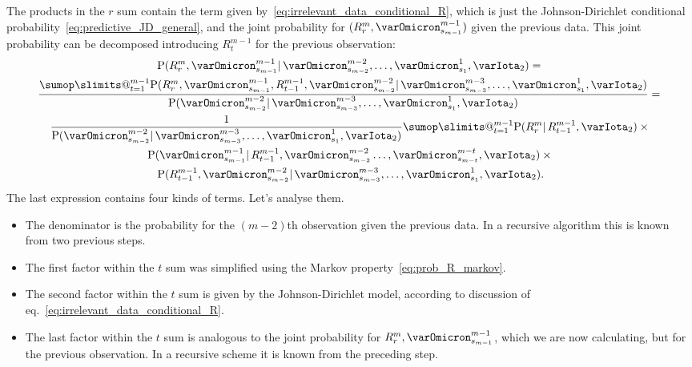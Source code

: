 \documentclass[\ifafour a4paper,12pt,\else a5paper,10pt,\fi%
onecolumn,oneside,article,%
british%
]{memoir}
\makeatletter
\theoremstyle{remark}
\theoremstyle{innote}
\def\sum{\DOTSI\sumop\slimits@}
\newcommand*{\p}{\mathrm{P}}%
\renewcommand*{\|}{\mathpunct{|}}
\newcommand*{\eqn}{eq.}%
\newcommand*{\yI}{\varIota}
\newcommand*{\yMc}{\yI_2}
\makeatother
\begin{document}
The products in the $r$ sum contain the term given
by~\eqref{eq:irrelevant_data_conditional_R}, which is just the
Johnson-Dirichlet conditional probability~\eqref{eq:predictive_JD_general},
and the joint probability for $(R^{m}_{r}, \varOmicron^{m-1}_{s_{m-1}})$ given the
previous data. This joint probability can be decomposed introducing
$R^{m-1}_{t}$ for the previous observation:
\begin{multline}
  \label{eq:prob_R_and_last_decompose}
  \p(R^{m}_{r}, \varOmicron^{m-1}_{s_{m-1}} \| \varOmicron^{m-2}_{s_{m-2}}, \dotsc, \varOmicron^{1}_{s_{1}}, \yMc) 
 ={} \\
  \frac{\sum_{t=1}^{m-1}
    \p(R^{m}_{r}, \varOmicron^{m-1}_{s_{m-1}}, R^{m-1}_{t-1}, \varOmicron^{m-2}_{s_{m-2}}
    \| \varOmicron^{m-3}_{s_{m-3}}, \dotsc, \varOmicron^{1}_{s_{1}}, \yMc)}{
\p(\varOmicron^{m-2}_{s_{m-2}} \| \varOmicron^{m-3}_{s_{m-3}}, \dotsc, \varOmicron^{1}_{s_{1}}, \yMc)}
  ={}\\
    \frac{1}{\p(\varOmicron^{m-2}_{s_{m-2}} \| \varOmicron^{m-3}_{s_{m-3}}, \dotsc, \varOmicron^{1}_{s_{1}}, \yMc)}
  \sum_{t=1}^{m-1} \p(R^{m}_{r} \| R^{m-1}_{t-1}, \yMc)
  \times{}\\
  \p(\varOmicron^{m-1}_{s_{m-1}} \|
    R^{m-1}_{t-1}, \varOmicron^{m-2}_{s_{m-2}} \dotsc, \varOmicron^{m-t}_{s_{m-t}}, \yMc)
    \times{}\\
 \p(R^{m-1}_{t-1}, \varOmicron^{m-2}_{s_{m-2}} \|
  \varOmicron^{m-3}_{s_{m-3}},\dotsc, \varOmicron^{1}_{s_{1}}, \yMc).
\end{multline}
The last expression contains four kinds of terms. Let's analyse them.

\begin{itemize}
\item The denominator is the probability for the $(m-2)$th observation
  given the previous data. In a recursive algorithm this is known from two
  previous steps.

\item The first factor within the $t$ sum was simplified using the Markov
  property~\eqref{eq:prob_R_markov}.

\item The second factor within the $t$ sum is given by the
  Johnson-Dirichlet model, according to discussion of
  \eqn~\eqref{eq:irrelevant_data_conditional_R}.

\item The last factor within the $t$ sum is analogous to the joint
  probability for $R^{m}_{r}, \varOmicron^{m-1}_{s_{m-1}}$, which we are now
  calculating, but for the previous observation. In a recursive scheme it
  is known from the preceding step.
\end{itemize}
\end{document}
